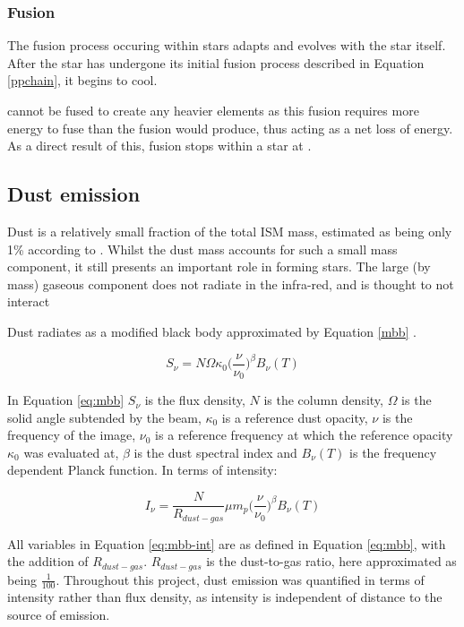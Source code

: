 \documentclass{report}
\begin{document}
\subsubsection{Fusion}
The fusion process occuring within stars adapts and evolves with the star itself. After the star has undergone its initial fusion process described in Equation \ref{ppchain}, it begins to cool.

 cannot be fused to create any heavier elements as this fusion requires more energy to fuse than the fusion would produce, thus acting as a net loss of energy. As a direct result of this, fusion stops within a star at .

\subsection{Dust emission}
Dust is a relatively small fraction of the total ISM mass, estimated as being only 1\% according to \textcite{noise}. Whilst the dust mass accounts for such a small mass component, it still presents an important role in forming stars. The large (by mass) gaseous component does not radiate in the infra-red, and is thought to not interact

Dust radiates as a modified black body approximated by Equation \ref{mbb} \parencite{noise}.

\begin{equation} \label{eq:mbb}
  S_{\nu} = N \Omega \kappa_{0} \Big(\frac{\nu}{\nu_{0}}\Big)^{\beta} B_{\nu}(T)
\end{equation}

In Equation \ref{eq:mbb} $S_{\nu}$ is the flux density, $N$ is the column density, $\Omega$ is the solid angle subtended by the beam, $\kappa_{0}$ is a reference dust opacity, $\nu$ is the frequency of the image, $\nu_{0}$ is a reference frequency at which the reference opacity $\kappa_{0}$ was evaluated at, $\beta$ is the dust spectral index and $B_{\nu}(T)$ is the frequency dependent Planck function. In terms of intensity:

\begin{equation} \label{eq:mbb-int}
  I_{\nu} = \frac{N}{R_{dust-gas}} \mu m_{p} \Big(\frac{\nu}{\nu_{0}}\Big)^{\beta} B_{\nu}(T)
\end{equation}

All variables in Equation \ref{eq:mbb-int} are as defined in Equation \ref{eq:mbb}, with the addition of $R_{dust-gas}$. $R_{dust-gas}$ is the dust-to-gas ratio, here approximated as being $\frac{1}{100}$. Throughout this project, dust emission was quantified in terms of intensity rather than flux density, as intensity is independent of distance to the source of emission.
\end{document}
